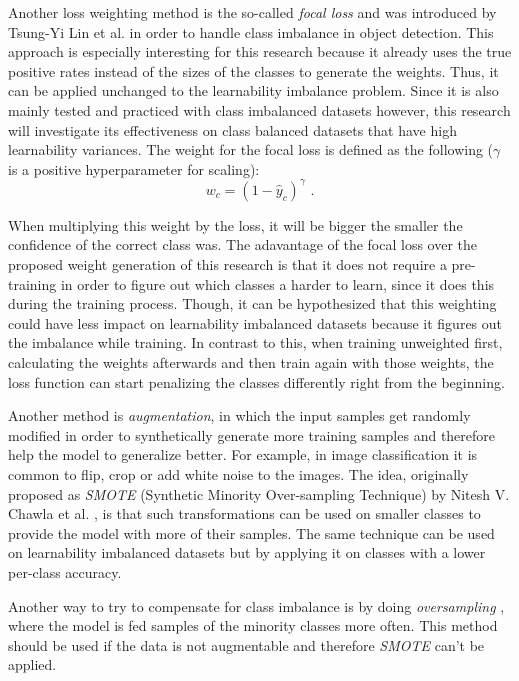 \documentclass[journal]{IEEEtran}
\begin{document}
Another loss weighting method is the so-called \emph{focal loss} and was introduced by Tsung-Yi Lin et al. \cite{lin2017focal} in order to handle class imbalance in object detection.
This approach is especially interesting for this research because it already uses the true positive rates instead of the sizes of the classes to generate the weights.
Thus, it can be applied unchanged to the learnability imbalance problem.
Since it is also mainly tested and practiced with class imbalanced datasets however, this research will investigate its effectiveness on class balanced datasets that have high learnability variances.
The weight for the focal loss is defined as the following ($\gamma$ is a positive hyperparameter for scaling):
\[ w_c = (1 - \hat{y}_c)^\gamma \text{ .} \]

When multiplying this weight by the loss, it will be bigger the smaller the confidence of the correct class was. 
The adavantage of the focal loss over the proposed weight generation of this research is that it does not require a pre-training in order to figure out which classes a harder to learn, since it does this during the training process.
Though, it can be hypothesized that this weighting could have less impact on learnability imbalanced datasets because it figures out the imbalance while training.
In contrast to this, when training unweighted first, calculating the weights afterwards and then train again with those weights, the loss function can start penalizing the classes differently right from the beginning.

Another method is \emph{augmentation}, in which the input samples get randomly modified in order to synthetically generate more training samples and therefore help the model to generalize better. 
For example, in image classification it is common to flip, crop or add white noise to the images. 
The idea, originally proposed as \emph{SMOTE} (Synthetic Minority Over-sampling Technique) by Nitesh V. Chawla et al. \cite{chawla2002smote}, is that such transformations can be used on smaller classes to provide the model with more of their samples.
The same technique can be used on learnability imbalanced datasets but by applying it on classes with a lower per-class accuracy.

Another way to try to compensate for class imbalance is by doing \emph{oversampling} \cite{chawla2002smote}, where the model is fed samples of the minority classes more often.
This method should be used if the data is not augmentable and therefore \emph{SMOTE} can't be applied.
\end{document}
